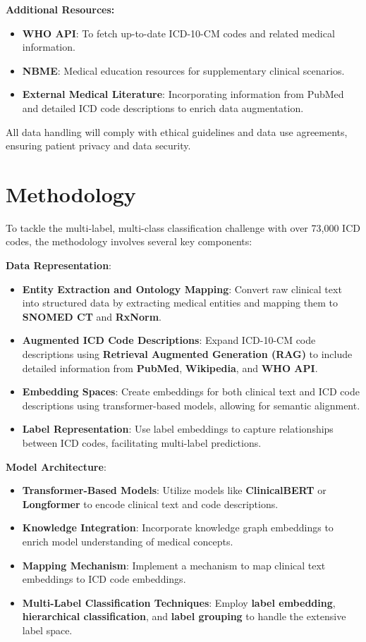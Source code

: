 \documentclass[10pt,a4paper]{article}
\begin{document}
\textbf{Additional Resources:}
\begin{itemize}
    \item \textbf{WHO API}: To fetch up-to-date ICD-10-CM codes and related medical information.
    \item \textbf{NBME}: Medical education resources for supplementary clinical scenarios.
    \item \textbf{External Medical Literature}: Incorporating information from PubMed and detailed ICD code descriptions to enrich data augmentation.
\end{itemize}

All data handling will comply with ethical guidelines and data use agreements, ensuring patient privacy and data security.

\section{Methodology}

To tackle the multi-label, multi-class classification challenge with over 73,000 ICD codes, the methodology involves several key components:

\textbf{Data Representation}:
\begin{itemize}
    \item \textbf{Entity Extraction and Ontology Mapping}: Convert raw clinical text into structured data by extracting medical entities and mapping them to \textbf{SNOMED CT} and \textbf{RxNorm}.
    \item \textbf{Augmented ICD Code Descriptions}: Expand ICD-10-CM code descriptions using \textbf{Retrieval Augmented Generation (RAG)} to include detailed information from \textbf{PubMed}, \textbf{Wikipedia}, and \textbf{WHO API}.
    \item \textbf{Embedding Spaces}: Create embeddings for both clinical text and ICD code descriptions using transformer-based models, allowing for semantic alignment.
    \item \textbf{Label Representation}: Use label embeddings to capture relationships between ICD codes, facilitating multi-label predictions.
\end{itemize}

\textbf{Model Architecture}:
\begin{itemize}
    \item \textbf{Transformer-Based Models}: Utilize models like \textbf{ClinicalBERT} or \textbf{Longformer} to encode clinical text and code descriptions.
    \item \textbf{Knowledge Integration}: Incorporate knowledge graph embeddings to enrich model understanding of medical concepts.
    \item \textbf{Mapping Mechanism}: Implement a mechanism to map clinical text embeddings to ICD code embeddings.
    \item \textbf{Multi-Label Classification Techniques}: Employ \textbf{label embedding}, \textbf{hierarchical classification}, and \textbf{label grouping} to handle the extensive label space.
\end{itemize}
\end{document}
